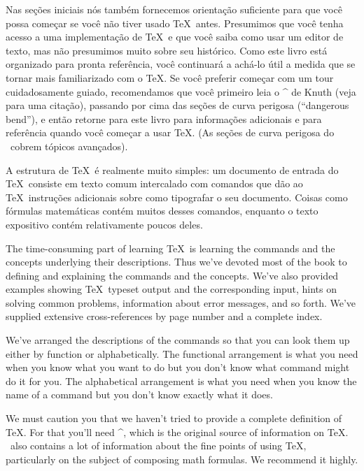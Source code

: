 Nas se\c c\~oes iniciais n\'os tamb\'em fornecemos orienta\c c\~ao 
suficiente para que voc\^e possa come\c car se voc\^e n\~ao tiver usado 
\TeX\ antes.  Presumimos que voc\^e tenha acesso a uma 
implementa\c c\~ao de \TeX\ e que voc\^e saiba como usar um editor de 
texto, mas n\~ao presumimos muito sobre seu hist\'orico.  Como este 
livro est\'a organizado para pronta refer\^encia, voc\^e continuar\'a a 
ach\'a-lo \'util a medida que se tornar mais familiarizado com o \TeX.  
Se voc\^e preferir come\c car com um tour cuidadosamente guiado, 
recomendamos que voc\^e primeiro leia o ^{\texbook} de Knuth (veja 
 para uma cita\c c\~ao), passando por cima das 
se\c c\~oes de curva perigosa (``dangerous bend''), e ent\~ao retorne 
para este livro para informa\c c\~oes adicionais e para refer\^encia 
quando voc\^e come\c car a usar \TeX.  (As se\c c\~oes de curva perigosa 
do \texbook\ cobrem t\'opicos avan\c cados).


A estrutura de \TeX\ \'e realmente muito simples: um documento de 
entrada do \TeX\ consiste em texto comum intercalado com comandos que 
d\~ao ao \TeX\ instru\c c\~oes adicionais sobre como tipografar o seu 
documento.  Coisas como f\'ormulas matem\'aticas cont\'em muitos desses 
comandos, enquanto o texto expositivo cont\'em relativamente poucos 
deles.







The time-consuming part of learning \TeX\ is learning the commands and
the concepts underlying their descriptions.  Thus we've devoted most of
the book to defining and explaining the commands and the concepts.
We've also provided examples showing \TeX\ typeset output and the
corresponding input, hints on solving common problems, information about
error messages, and so forth.  We've supplied extensive cross-references
by page number and a complete index.

We've arranged the descriptions of the commands so that you can look
them up either by function or alphabetically.  The functional
arrangement is what you need when you know what you want to do but you
don't know what command might do it for you.  The alphabetical arrangement
is what you need when you know the name of a command but you don't know exactly
what it does.

We must caution you that we haven't tried to provide a complete
definition of \TeX.  For that you'll need ^{\texbook}, which is the
original source of information on \TeX.  \texbook\ also contains a lot
of information about the fine points of using \TeX, particularly on the
subject of composing math formulas.  We recommend it highly.

